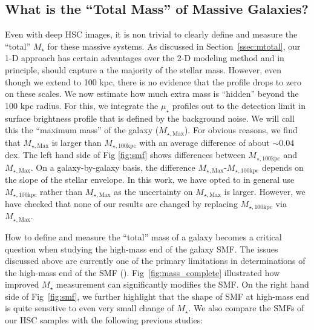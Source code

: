 \documentclass[a4paper,fleqn,usenatbib]{mnras}
\def\mstar{{$M_{\star}$}}
\def\mtot{{$M_{\star,100\mathrm{kpc}}$}}
\def\mmax{{$M_{\star,\mathrm{Max}}$}}
\def\mden{{$\mu_{\star}$}}
\begin{document}
\subsection{What is the ``Total Mass'' of Massive Galaxies?}

    Even with deep HSC images, it is non trivial to clearly define and measure the
    ``total'' \mstar{} for these massive systems. 
    As discussed in Section~\ref{ssec:mtotal}, our 1-D approach has certain advantages 
    over the 2-D modeling method and in principle, should capture a the majority of 
    the stellar mass. 
    However, even though we extend to 100 kpc, there is no evidence that the profile 
    drops to zero on these scales. 
    We now estimate how much extra mass is ``hidden'' beyond the 100 kpc radius. 
    For this, we integrate the \mden{} profiles out to the detection limit in 
    surface brightness profile that is defined by the background noise.
    We will call this the ``maximum mass'' of the galaxy (\mmax{}). 
    For obvious reasons, we find that \mmax{} is larger than \mtot{} with an average 
    difference of about ${\sim}0.04$ dex. 
    The left hand side of Fig \ref{fig:smf} shows differences between \mtot{}
    and \mmax{}. 
    On a galaxy-by-galaxy basis, the difference \mmax{}-\mtot{} depends on the slope 
    of the stellar envelope. 
    In this work, we have opted to in general use \mtot{} rather than \mmax{} as the 
    uncertainty on \mmax{} is larger. 
    However, we have checked that none of our results are changed by replacing \mtot{} 
    via \mmax{}.
        
    How to define and measure the ``total'' mass of a galaxy becomes a critical 
    question when studying the high-mass end of the galaxy SMF. 
    The issues discussed above are currently one of the primary limitations in 
    determinations of the high-mass end of the SMF (\citealt{Bernardi2017}). 
    Fig~\ref{fig:mass_complete} illustrated how improved \mstar{} measurement can 
    significantly modifies the SMF. 
    On the right hand side of Fig~\ref{fig:smf}, we further highlight that 
    the shape of SMF at high-mass end is quite sensitive to even very small 
    change of \mstar{}. 
    We also compare the SMFs of our HSC samples with the following previous studies:
        
\end{document}

